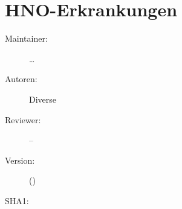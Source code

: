 \def\ChapterCode{FORTBILDUNG}
	\chapter
[\CO{[FORTBILDUNG]} HNO-Erkrankungen]
{HNO-Erkrankungen}
\label{chp:ADVANCED-Atemweg}

\ChapterIntro
{%

}
{%
\begin{description}
  \item[Maintainer:] \ldots
  \item[Autoren:] Diverse
  \item[Reviewer:] --
  \item[Version:] {\DocVersion} ({\DocVersionInfo})
  \item[SHA1:] {\DocGitCommit}
\end{description}

{\TxTeilkapitelAASS}}



\clearpage %


\ChapterEnd